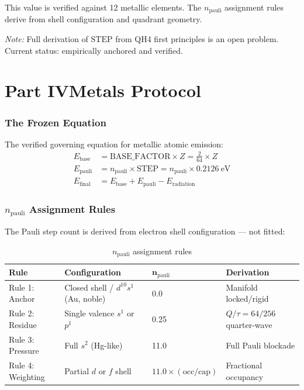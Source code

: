 \documentclass[12pt,a4paper]{article}
\theoremstyle{definition}
\begin{document}
This value is verified against 12 metallic elements. The $n_{\mathrm{pauli}}$ assignment rules derive from shell configuration and quadrant geometry.

\textit{Note:} Full derivation of $\mathrm{STEP}$ from QH4 first principles is an open problem. Current status: empirically anchored and verified.

\part*{Part IV\quad Metals Protocol}

\section{The Frozen Equation}

The verified governing equation for metallic atomic emission:
\begin{align}
  E_{\mathrm{base}}     &= \mathrm{BASE\_FACTOR} \times Z = \frac{2}{64} \times Z \label{eq:Ebase}\\
  E_{\mathrm{pauli}}    &= n_{\mathrm{pauli}} \times \mathrm{STEP} = n_{\mathrm{pauli}} \times 0.2126\ \mathrm{eV} \label{eq:Epauli}\\
  E_{\mathrm{final}}    &= E_{\mathrm{base}} + E_{\mathrm{pauli}} - E_{\mathrm{radiation}} \label{eq:Efinal}
\end{align}

\section{$n_{\mathrm{pauli}}$ Assignment Rules}

The Pauli step count is derived from electron shell configuration --- not fitted:

\begin{table}[h!]
\centering
\caption{$n_{\mathrm{pauli}}$ assignment rules}
\begin{tabular}{llll}
\toprule
\textbf{Rule} & \textbf{Configuration} & $\boldsymbol{n_{\mathrm{pauli}}}$ & \textbf{Derivation}\\
\midrule
Rule 1: Anchor  & Closed shell / $d^{10}s^{1}$ (Au, noble) & 0.0              & Manifold locked/rigid\\
Rule 2: Residue & Single valence $s^{1}$ or $p^{1}$        & 0.25             & $Q/\tau = 64/256$ quarter-wave\\
Rule 3: Pressure& Full $s^{2}$ (Hg-like)                   & 11.0             & Full Pauli blockade\\
Rule 4: Weighting& Partial $d$ or $f$ shell                & $11.0\times(\mathrm{occ}/\mathrm{cap})$ & Fractional occupancy\\
\bottomrule
\end{tabular}
\end{table}
\end{document}
